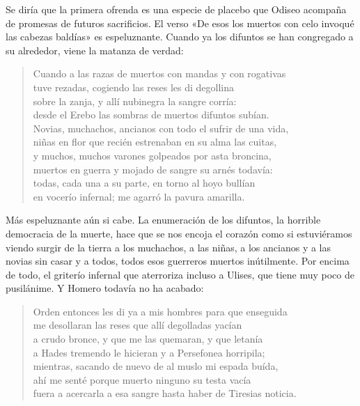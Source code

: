 Se diría que la primera ofrenda es una especie de placebo que Odiseo acompaña de promesas de futuros sacrificios. El verso «De esos los muertos con celo invoqué las cabezas baldías» es espeluznante. Cuando ya los difuntos se han congregado a su alrededor, viene la matanza de verdad:

\begin{verse}
Cuando a las razas de muertos con mandas y con rogativas\\
tuve rezadas, cogiendo las reses les di degollina\\
sobre la zanja, y allí nubinegra la sangre corría:\\
desde el Erebo las sombras de muertos difuntos subían.\\
Novias, muchachos, ancianos con todo el sufrir de una vida,\\
niñas en flor que recién estrenaban en su alma las cuitas,\\
y muchos, muchos varones golpeados por asta broncina,\\
muertos en guerra y mojado de sangre su arnés todavía:\\
todas, cada una a su parte, en torno al hoyo bullían\\
en vocerío infernal; me agarró la pavura amarilla.
\end{verse}

Más espeluznante aún si cabe. La enumeración de los difuntos, la horrible democracia de la muerte, hace que se nos encoja el corazón como si estuviéramos viendo surgir de la tierra a los muchachos, a las niñas, a los ancianos y a las novias sin casar y a todos, todos esos guerreros muertos inútilmente. Por encima de todo, el griterío infernal que aterroriza incluso a Ulises, que tiene muy poco de pusilánime. Y Homero todavía no ha acabado:

\begin{verse}
Orden entonces les di ya a mis hombres para que enseguida\\
me desollaran las reses que allí degolladas yacían\\
a crudo bronce, y que me las quemaran, y que letanía\\
a Hades tremendo le hicieran y a Persefonea horripila;\\
mientras, sacando de nuevo de al muslo mi espada buída,\\
ahí me senté porque muerto ninguno su testa vacía\\
fuera a acercarla a esa sangre hasta haber de Tiresias noticia.
\end{verse}

